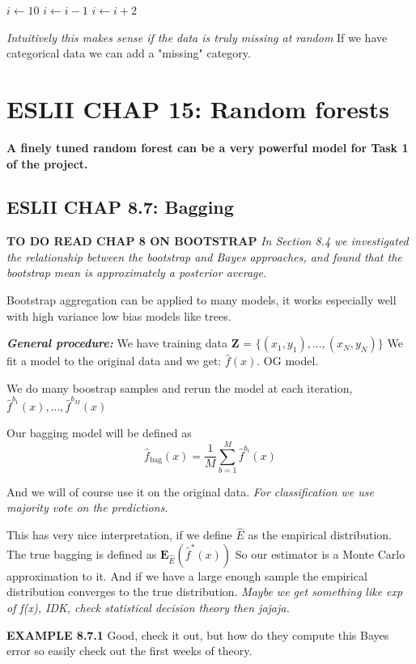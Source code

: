 \documentclass{article}
\begin{document}
\begin{algorithmic}
\State $i \gets 10$
    \State $i \gets i-1$
\Else
        \State $i \gets i+2$
    \EndIf
\EndIf 
\end{algorithmic}


\textit{Intuitively this makes sense if the data is truly missing at random}
If we have categorical data we can add a "missing" category.

\section{ESLII CHAP 15: Random forests}
\textbf{A finely tuned random forest can be a very powerful model for Task 1 of the project.} 


\subsection{ESLII CHAP 8.7:  Bagging}
\textbf{TO DO READ CHAP 8 ON BOOTSTRAP} \textit{In Section 8.4 we investigated
the relationship between the bootstrap and Bayes approaches, and found
that the bootstrap mean is approximately a posterior average.}


Bootstrap aggregation can be applied to many models, it works especially well with high variance low bias models like trees.

\textbf{\textit{General procedure:}}
We have training data \textbf{Z} = $\{(x_1,y_1),...,(x_N, y_N) \}$
We fit a model to the original data and we get: $\hat{f}(x)$. OG model.

We do many boostrap samples and rerun the model at each iteration, $\hat{f}^{b_1}(x),...,\hat{f}^{b_M}(x)$

Our bagging model will be defined as $$\hat{f}_{\textrm{bag}}(x) = \frac{1}{M} \sum_{b=1}^M \hat{f}^{b_i}(x)$$

And we will of course use it on the original data. \textit{For classification we use majority vote on the predictions.}

This has very nice interpretation, if we define $\hat{E}$ as the empirical distribution.
The true bagging is defined as $\textbf{E}_{\hat{E}}(\hat{f}^*(x))$ So our estimator is a Monte Carlo approximation to it. And if we have a large enough sample the empirical distribution converges to the true distribution. \textit{Maybe we get something like exp of f(x), IDK, check statistical decision theory then jajaja. }

\textbf{EXAMPLE 8.7.1} Good, check it out, but how do they compute this Bayes error so easily check out the first weeks of theory.
\end{document}
